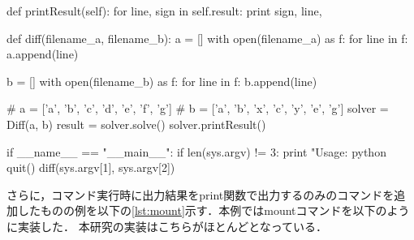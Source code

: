 \begin{mylisting}[label={lst:diff},language=sh,caption=diffコマンド]
  def printResult(self):
    for line, sign in self.result:
      print sign, line,

def diff(filename_a, filename_b):
  a = []
  with open(filename_a) as f:
    for line in f:
      a.append(line)

  b = []
  with open(filename_b) as f:
    for line in f:
      b.append(line)

  # a = ['a', 'b', 'c', 'd', 'e', 'f', 'g']
  # b = ['a', 'b', 'x', 'c', 'y', 'e', 'g']
  solver = Diff(a, b)
  result = solver.solve()
  solver.printResult()

if __name__ == "__main__":
  if len(sys.argv) != 3:
    print "Usage: python %
    quit()
  diff(sys.argv[1], sys.argv[2])
\end{mylisting}
\vspace{3mm}
さらに，コマンド実行時に出力結果をprint関数で出力するのみのコマンドを追加したものの例を以下の\ref{lst:mount}示す．本例ではmountコマンドを以下のように実装した．
本研究の実装はこちらがほとんどとなっている．
\vspace{3mm}
